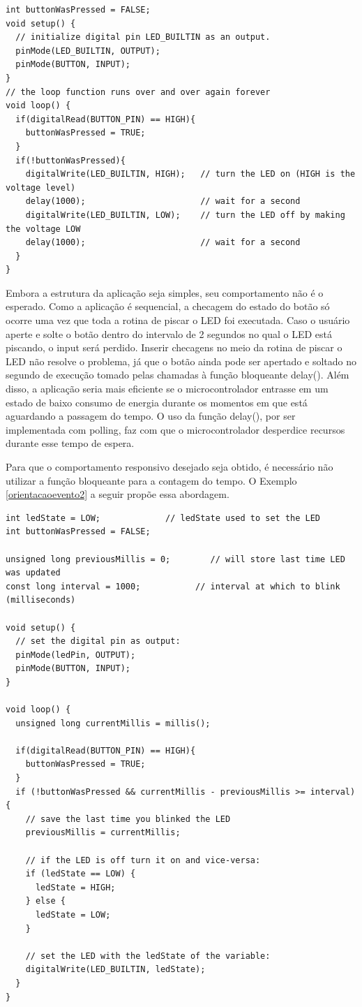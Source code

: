 \documentclass[11pt]{article}
\begin{document}
\begin{lstlisting}[style=CStyle,label=orientacaoevento1,caption=Aplicação bloqueante]
int buttonWasPressed = FALSE;
void setup() {
  // initialize digital pin LED_BUILTIN as an output.
  pinMode(LED_BUILTIN, OUTPUT);
  pinMode(BUTTON, INPUT);
}
// the loop function runs over and over again forever
void loop() {
  if(digitalRead(BUTTON_PIN) == HIGH){
    buttonWasPressed = TRUE;
  }
  if(!buttonWasPressed){ 
    digitalWrite(LED_BUILTIN, HIGH);   // turn the LED on (HIGH is the voltage level)
    delay(1000);                       // wait for a second
    digitalWrite(LED_BUILTIN, LOW);    // turn the LED off by making the voltage LOW
    delay(1000);                       // wait for a second
  }
}
\end{lstlisting}
\par Embora a estrutura da aplicação seja simples, seu comportamento não é o esperado. Como a aplicação é sequencial, a checagem do estado do botão só ocorre uma vez que toda a rotina de piscar o LED foi executada. Caso o usuário aperte e solte o botão dentro do intervalo de 2 segundos no qual o LED está piscando, o input será perdido. Inserir checagens no meio da rotina de piscar o LED não resolve o problema, já que o botão ainda pode ser apertado e soltado no segundo de execução tomado pelas chamadas à função bloqueante delay(). Além disso, a aplicação seria mais eficiente se o microcontrolador entrasse em um estado de baixo consumo de energia durante os momentos em que está aguardando a passagem do tempo. O uso da função delay(), por ser implementada com polling, faz com que o microcontrolador desperdice recursos durante esse tempo de espera.
\par Para que o comportamento responsivo desejado seja obtido, é necessário não utilizar a função bloqueante para a contagem do tempo. O Exemplo \ref{orientacaoevento2} a seguir propõe essa abordagem.
\begin{lstlisting}[style=CStyle,label=orientacaoevento2,caption=Aplicação não bloqueante]
int ledState = LOW;             // ledState used to set the LED
int buttonWasPressed = FALSE;

unsigned long previousMillis = 0;        // will store last time LED was updated
const long interval = 1000;           // interval at which to blink (milliseconds)

void setup() {
  // set the digital pin as output:
  pinMode(ledPin, OUTPUT);
  pinMode(BUTTON, INPUT);
}

void loop() {
  unsigned long currentMillis = millis();

  if(digitalRead(BUTTON_PIN) == HIGH){
    buttonWasPressed = TRUE;
  }
  if (!buttonWasPressed && currentMillis - previousMillis >= interval) {
    // save the last time you blinked the LED
    previousMillis = currentMillis;

    // if the LED is off turn it on and vice-versa:
    if (ledState == LOW) {
      ledState = HIGH;
    } else {
      ledState = LOW;
    }

    // set the LED with the ledState of the variable:
    digitalWrite(LED_BUILTIN, ledState);
  }
}
\end{lstlisting}
\end{document}
